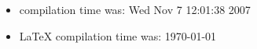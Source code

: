\documentclass{article}
\begin{document}
\begin{itemize}
  \item \Rlogo{} compilation time was: Wed Nov  7 12:01:38 2007
  \item \LaTeX{} compilation time was: \today
\end{itemize}


\clearpage
{}


\end{document}
